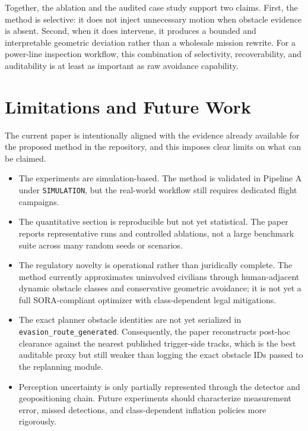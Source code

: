 \documentclass[a4paper,11pt]{article}
\begin{document}
Together, the ablation and the audited case study support two claims. First, the method is selective: it does not inject unnecessary motion when obstacle evidence is absent. Second, when it does intervene, it produces a bounded and interpretable geometric deviation rather than a wholesale mission rewrite. For a power-line inspection workflow, this combination of selectivity, recoverability, and auditability is at least as important as raw avoidance capability.


\section{Limitations and Future Work}

The current paper is intentionally aligned with the evidence already available for the proposed method in the repository, and this imposes clear limits on what can be claimed.
\begin{itemize}[leftmargin=1.3em]
    \item The experiments are simulation-based. The method is validated in Pipeline A under \texttt{SIMULATION}, but the real-world workflow still requires dedicated flight campaigns.
    \item The quantitative section is reproducible but not yet statistical. The paper reports representative runs and controlled ablations, not a large benchmark suite across many random seeds or scenarios.
    \item The regulatory novelty is operational rather than juridically complete. The method currently approximates uninvolved civilians through human-adjacent dynamic obstacle classes and conservative geometric avoidance; it is not yet a full SORA-compliant optimizer with class-dependent legal mitigations.
    \item The exact planner obstacle identities are not yet serialized in \texttt{evasion\_route\_generated}. Consequently, the paper reconstructs post-hoc clearance against the nearest published trigger-side tracks, which is the best auditable proxy but still weaker than logging the exact obstacle IDs passed to the replanning module.
    \item Perception uncertainty is only partially represented through the detector and geopositioning chain. Future experiments should characterize measurement error, missed detections, and class-dependent inflation policies more rigorously.
\end{itemize}
\end{document}
